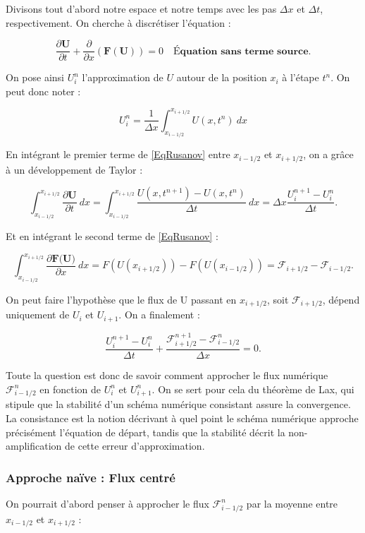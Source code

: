 \documentclass[
11pt, %
francais, %
singlespacing, %
headsepline, %
]{MastersDoctoralThesis} %
\begin{document}
Divisons tout d'abord notre espace et notre temps avec les pas $\Delta x$ et $\Delta t$, respectivement. On cherche à discrétiser l'équation : 

$$\frac{\partial\textbf{U}}{\partial t}+\frac{\partial}{\partial x}(\textbf{F} (\textbf{U})) = 0 \quad \textbf{Équation sans terme source} \label{EqRusanov} .$$

On pose ainsi $U_i ^n$ l'approximation de $U$ autour de la position $x_i$ à l'étape $t^n$. On peut donc noter :

$$ U_i ^n = \frac{1}{\Delta x}\int_{x_{i-1/2}}^{x_{i+1/2}} U(x,t^n) \ dx $$

En intégrant le premier terme de \ref{EqRusanov} entre $x_{i-1/2}$ et $x_{i+1/2}$, on a grâce à un développement de Taylor :

$$ \int_{x_{i-1/2}}^{x_{i+1/2}} \frac{\partial\textbf{U}}{\partial t} \ dx = \int_{x_{i-1/2}}^{x_{i+1/2}} \frac{U(x,t^{n+1}) - U(x,t^{n})}{\Delta t} \ dx = \Delta x \frac{ U_i ^{n+1} - U_i ^{n}}{\Delta t} .$$

Et en intégrant le second terme de \ref{EqRusanov} : 

$$ \int_{x_{i-1/2}}^{x_{i+1/2}} \frac{\partial\textbf{F(U)}}{\partial x} \ dx = F(U(x_{i+1/2})) - F(U(x_{i-1/2} )) = \mathcal{F}_{i+1/2} - \mathcal{F}_{i-1/2}.$$

On peut faire l'hypothèse que le flux de U passant en $x_{i+1/2}$, soit $\mathcal{F}_{i+1/2}$, dépend uniquement de $U_i$ et $U_{i+1}$. On a finalement :

$$ \frac{ U_i ^{n+1} - U_i ^{n}}{\Delta t} + \frac{ \mathcal{F}_{i+1/2} ^{n+1} - \mathcal{F}_{i-1/2} ^{n} }{\Delta x} = 0.$$

Toute la question est donc de savoir comment approcher le flux numérique $\mathcal{F}_{i-1/2} ^{n}$ en fonction de $U_i ^n$ et $U_{i+1} ^n$. On se sert pour cela du théorème de Lax, qui stipule que la stabilité d'un schéma numérique consistant assure la convergence. La consistance est la notion décrivant à quel point le schéma numérique approche précisément l'équation de départ, tandis que la stabilité décrit la non-amplification de cette erreur d'approximation.

\subsubsection{Approche naïve : Flux centré }

On pourrait d'abord penser à approcher le flux $\mathcal{F}_{i-1/2} ^{n}$ par la moyenne entre $x_{i-1/2}$ et $x_{i+1/2}$ :
\end{document}
